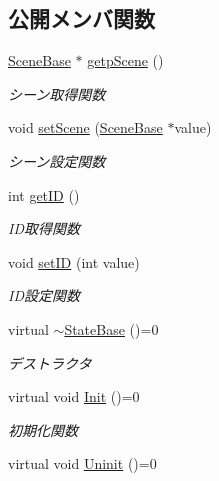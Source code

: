 \subsection*{公開メンバ関数}
\begin{DoxyCompactItemize}
\item 
\mbox{\hyperlink{class_scene_base}{Scene\+Base}} $\ast$ \mbox{\hyperlink{class_scene_base_1_1_state_base_a5333fd722f17c6da71b09afdc56c84b4}{getp\+Scene}} ()
\begin{DoxyCompactList}\small\item\em シーン取得関数 \end{DoxyCompactList}\item 
void \mbox{\hyperlink{class_scene_base_1_1_state_base_adfb19da59b938832387aa10528bedb44}{set\+Scene}} (\mbox{\hyperlink{class_scene_base}{Scene\+Base}} $\ast$value)
\begin{DoxyCompactList}\small\item\em シーン設定関数 \end{DoxyCompactList}\item 
int \mbox{\hyperlink{class_scene_base_1_1_state_base_a489f32b0d355790f91164c5f71a6fee3}{get\+ID}} ()
\begin{DoxyCompactList}\small\item\em I\+D取得関数 \end{DoxyCompactList}\item 
void \mbox{\hyperlink{class_scene_base_1_1_state_base_a924e400bdb8be957b92ee2ac3177534d}{set\+ID}} (int value)
\begin{DoxyCompactList}\small\item\em I\+D設定関数 \end{DoxyCompactList}\item 
virtual \mbox{\hyperlink{class_scene_base_1_1_state_base_a349212d453f37028a9b41d2d3b25e6ed}{$\sim$\+State\+Base}} ()=0
\begin{DoxyCompactList}\small\item\em デストラクタ \end{DoxyCompactList}\item 
virtual void \mbox{\hyperlink{class_scene_base_1_1_state_base_a33350231b039a2178c19beac0211c5b8}{Init}} ()=0
\begin{DoxyCompactList}\small\item\em 初期化関数 \end{DoxyCompactList}\item 
virtual void \mbox{\hyperlink{class_scene_base_1_1_state_base_a2763fa37e45b39bd8d3bbb735c76c59b}{Uninit}} ()=0

\end{DoxyCompactItemize}
